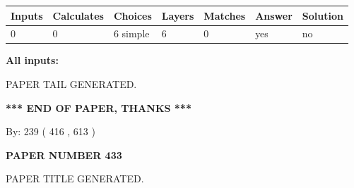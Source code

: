 \documentclass{ctexart}
\begin{document}
 
   
   
   
   
\noindent\begin{tabular}{|l|l|l|l|l|l|l|}
 \hline
Inputs & Calculates & Choices & Layers & Matches & Answer & Solution \\ \hline
 0  & 
 0  & 
 6
  simple  
  & 
 6  & 
 0  & 
  yes & 
  no 
  \\ \hline
 \end{tabular}
   
   
   
   
\noindent{}
   
   
   
   
\noindent\vspace{0.1in}\hspace{-0.08in} {\textbf{\Large{All inputs: }}}
   
   
   
   
   
   
 \vspace{0.2in}
 
   
   
\vspace{2.0in} PAPER TAIL GENERATED.
   
   
   
   
\vspace{1.0in} 
{\textbf{\large{ *** END OF PAPER, THANKS *** }}} 
   
   
\hspace{1.0in} By: 
 239 ( 416 ,  613 )
   
   
   
   
\newpage 
\setcounter{page}{ 
   433001 } 
   
   
   
   
 {\textbf{ \Large{ PAPER NUMBER  433  }}}
   
   
\vspace{0.2in}
   
   
   
   
   
   
   
   
 \vspace{0.2in}
 
 
 
 
   
   
 PAPER TITLE GENERATED.
   
\end{document}

